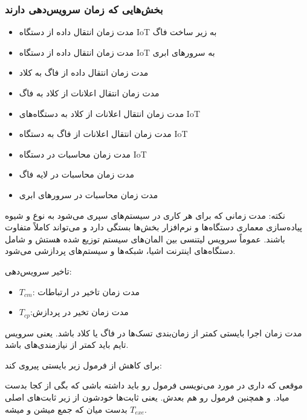 \subsubsection{بخش‌هایی که زمان سرویس‌دهی دارند}

\begin{itemize}
    \item مدت زمان انتقال داده از دستگاه IoT به زیر ساخت فاگ
    \item مدت زمان انتقال داده از دستگاه IoT به سرور‌های ابری
    \item مدت زمان انتقال داده از فاگ به کلاد
    \item مدت زمان انتقال اعلانات از کلاد به فاگ
    \item مدت زمان انتقال اعلانات از کلاد به دستگاه‌های IoT
    \item مدت زمان انتقال اعلانات از فاگ به دستگاه IoT
    \item مدت زمان محاسبات در دستگاه IoT
    \item مدت زمان محاسبات در لایه فاگ
    \item مدت زمان محاسبات در سرور‌های ابری
\end{itemize}

نکته: مدت زمانی که برای هر کاری در سیستم‌های  سپری می‌شود به نوع و شیوه
پیاده‌سازی معماری دستگاه‌ها و نرم‌افزار بخش‌ها بستگی دارد و می‌تواند کاملاً
متفاوت باشند. عموماً سرویس لیتنسی بین المان‌های سیستم  توزیع شده هستش و
شامل دستگاه‌های اینترنت اشیا، شبکه‌ها و سیستم‌های پردازشی می‌شود.

تاخیر سرویس‌دهی:


\begin{itemize}
    \item $T_{cm}$: مدت زمان تاخیر در ارتباطات
    \item $T_{cp}$:مدت زمان تخیر در پردازش
\end{itemize}

مدت زمان اجرا بایستی کمتر از زمان‌بندی تسک‌ها در فاگ یا کلاد باشد. یعنی سرویس
تایم باید کمتر از نیازمندی‌های  باشد.

برای کاهش  از فرمول زیر بایستی پیروی کند:


موقعی که داری در مورد  می‌نویسی فرمول  رو باید داشته باشی که بگی از کجا بدست میاد. و همچنین فرمول
 رو هم بعدش. یعنی ثابت‌ها خودشون از زیر ثابت‌های اصلی
بدست میان که جمع میشن و میشه $T_{exe}$.

